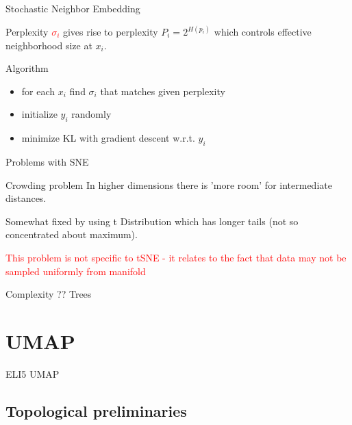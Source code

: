 \documentclass[unknownkeysallowed]{beamer}
\begin{document}
\begin{frame}{Stochastic Neighbor Embedding}

\begin{block}{Perplexity}
\textcolor{red}{$\sigma_i$} gives rise to perplexity $P_i = 2^{H(p_i)}$ which controls effective neighborhood size at $x_i$.
\end{block}

\begin{block}{Algorithm}
\begin{itemize}
	\item for each $x_i$ find $\sigma_i$ that matches given perplexity
    \item initialize $y_i$ randomly
    \item minimize KL with gradient descent w.r.t. $y_i$
\end{itemize}
\end{block}

\end{frame}


\begin{frame}{Problems with SNE}

\begin{block}{Crowding problem}
In higher dimensions there is 'more room' for intermediate distances.


Somewhat fixed by using t Distribution which has longer tails (not so concentrated about maximum).

\textcolor{red}{This problem is not specific to tSNE - it relates to the fact that data may not be sampled uniformly from manifold}
\end{block}

\begin{block}{Complexity}
?? Trees
\end{block}

\end{frame}

\section{UMAP}


\begin{frame}{ELI5 UMAP}

\end{frame}

\subsection{Topological preliminaries}
\end{document}
